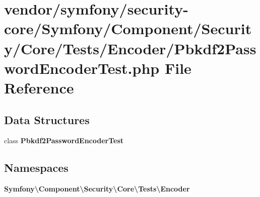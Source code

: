 \section{vendor/symfony/security-\/core/\+Symfony/\+Component/\+Security/\+Core/\+Tests/\+Encoder/\+Pbkdf2\+Password\+Encoder\+Test.php File Reference}
\label{_pbkdf2_password_encoder_test_8php}
\subsection*{Data Structures}
\begin{DoxyCompactItemize}
\item 
class {\bf Pbkdf2\+Password\+Encoder\+Test}
\end{DoxyCompactItemize}
\subsection*{Namespaces}
\begin{DoxyCompactItemize}
\item 
 {\bf Symfony\textbackslash{}\+Component\textbackslash{}\+Security\textbackslash{}\+Core\textbackslash{}\+Tests\textbackslash{}\+Encoder}
\end{DoxyCompactItemize}
